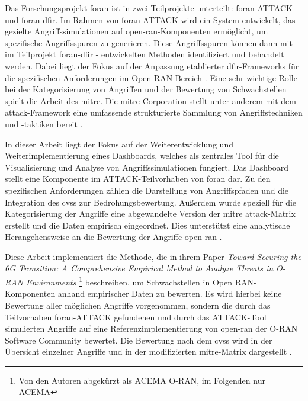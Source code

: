 \par Das Forschungsprojekt \gls{foran} ist in zwei Teilprojekte unterteilt: \gls{foran}-ATTACK und \gls{foran}-\gls{dfir}. Im Rahmen von \gls{foran}-ATTACK wird ein System entwickelt, das gezielte Angriffssimulationen auf \gls{open-ran}-Komponenten ermöglicht, um spezifische Angriffsspuren zu generieren. Diese Angriffsspuren können dann mit - im Teilprojekt \gls{foran}-\gls{dfir} - entwickelten Methoden identifiziert und behandelt werden. Dabei liegt der Fokus auf der Anpassung etablierter \gls{dfir}-Frameworks für die spezifischen Anforderungen im Open RAN-Bereich \autocite{5GFORAN}. Eine sehr wichtige Rolle bei der Kategorisierung von Angriffen und der Bewertung von Schwachstellen spielt die Arbeit des \gls{mitre}. Die \gls{mitre}-Corporation stellt unter anderem mit dem \gls{attack}-Framework eine umfassende strukturierte Sammlung von Angriffstechniken und -taktiken bereit \autocite{SolvingProblemsSafer2024,MITREATTCK}.
\par
In dieser Arbeit liegt der Fokus auf der Weiterentwicklung und Weiterimplementierung eines Dashboards, welches als zentrales Tool für die Visualisierung und Analyse von Angriffssimulationen fungiert. Das Dashboard stellt eine Komponente im ATTACK-Teilvorhaben von \gls{foran} dar. Zu den spezifischen Anforderungen zählen die Darstellung von Angriffspfaden und die Integration des \gls{cvss} zur Bedrohungsbewertung. Außerdem wurde speziell für die Kategorisierung der Angriffe eine abgewandelte Version der \gls{mitre} \gls{attack}-Matrix erstellt und die Daten empirisch eingeordnet. Dies unterstützt eine analytische Herangehensweise an die Bewertung der Angriffe \gls{open-ran} \autocite{dieterichDevelopmentAdversarySimulation2024}.
\par
Diese Arbeit implementiert die Methode, die \citeauthor{klementSecuring6GTransition2024} in ihrem Paper \textit{Toward Securing the 6G Transition: A Comprehensive Empirical Method to  Analyze Threats in O-RAN Environments} \footnote{Von den Autoren abgekürzt als ACEMA O-RAN, im Folgenden nur ACEMA} beschreiben, um Schwachstellen in Open RAN-Komponenten anhand empirischer Daten zu bewerten. Es wird hierbei keine Bewertung aller möglichen Angriffe vorgenommen, sondern die durch das Teilvorhaben \gls{foran}-ATTACK gefundenen und durch das ATTACK-Tool simulierten Angriffe auf eine Referenzimplementierung von \gls{open-ran} der O-RAN Software Community bewertet. Die Bewertung nach dem \gls{cvss} wird in der Übersicht einzelner Angriffe und in der modifizierten \gls{mitre}-Matrix dargestellt \autocite{dieterichDevelopmentAdversarySimulation2024,klementSecuring6GTransition2024}.
